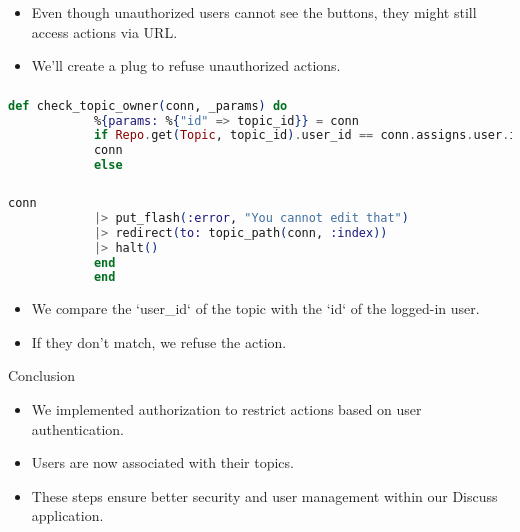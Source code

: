\documentclass[aspectratio=169, table]{beamer}
\begin{document}
	\begin{frame}{}
		\begin{itemize}
			\item Even though unauthorized users cannot see the buttons, they might still access actions via URL.
			\item We'll create a plug to refuse unauthorized actions.
		\end{itemize}
	\end{frame}
	
	\begin{frame}[fragile]
		\frametitle{}
		\begin{lstlisting}[language=Elixir]
			def check_topic_owner(conn, _params) do
			%{params: %{"id" => topic_id}} = conn
			if Repo.get(Topic, topic_id).user_id == conn.assigns.user.id do
			conn
			else
		\end{lstlisting}
	\end{frame}
	
	\begin{frame}[fragile]
		\frametitle{}
		\begin{lstlisting}[language=Elixir]
			conn
			|> put_flash(:error, "You cannot edit that")
			|> redirect(to: topic_path(conn, :index))
			|> halt()
			end
			end
		\end{lstlisting}
		\begin{itemize}
			\item We compare the `user\_id` of the topic with the `id` of the logged-in user.
			\item If they don't match, we refuse the action.
		\end{itemize}
	\end{frame}
	
	\begin{frame}{Conclusion}
		\begin{itemize}
			\item We implemented authorization to restrict actions based on user authentication.
			\item Users are now associated with their topics.
			\item These steps ensure better security and user management within our Discuss application.
		\end{itemize}
	\end{frame}
	
\end{document}
